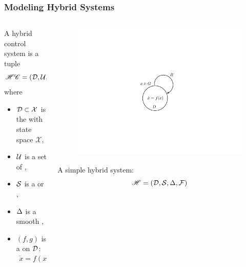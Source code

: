 \documentclass{beamer}
\begin{document}
\begin{frame}
  \frametitle{Modeling Hybrid Systems}
  \begin{columns}
    \begin{column}{.63\textwidth}
      \begin{definition}
        A \alert{hybrid control system} is a tuple \vspace{-.3cm}
        $$\HCS = \hcsystem, \vspace{-.4cm}$$
        where
        \begin{itemize}
        \item
          $\mathcal{D} \subset \mathcal{X}$ is the  with state space $\mathcal{X}$,
        \item
          $\mathcal{U}$ is a set of ,
        \item
          $\mathcal{S}$ is a  or ,
        \item
          $\Delta$ is a smooth ,
        \item
          $(f, g)$ is a  on $\mathcal{D}$: \vspace{-3mm}
          \begin{align*}
            \dot{x} = f(x) + g(x) \, u.
          \end{align*}
        \end{itemize}
      \end{definition}
    \end{column}
    \begin{column}{.4\textwidth}
      \begin{figure}
        \centering
        \includegraphics[width=.9\textwidth]{hsystem}\\
      \end{figure}
      A \alert{simple hybrid system}:\vspace{-.3cm}
      $$\mathscr{H} = (\mathcal{D}, \mathcal{S}, \Delta, \mathcal{F})$$
    \end{column}
  \end{columns}
\end{frame}
\end{document}
